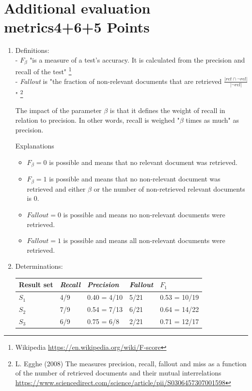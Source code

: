 \documentclass[10pt,a4paper]{article}
\begin{document}
\section{\hfill Additional evaluation metrics\hfill 4+6+5 Points}
\begin{enumerate}
    \item Definitions:\\
        - $F_\beta$ "is a measure of a test's accuracy. It is calculated from the precision and recall of the test" \footnote{Wikipedia \url{https://en.wikipedia.org/wiki/F-score}}\\
        - \textit{Fallout} is "the fraction of non-relevant documents that are retrieved $ \frac{|ret\cap \neg rel|}{|\neg rel|} $" \footnote{L. Egghe (2008) The measures precision, recall, fallout and miss as a function of the number of retrieved documents and their mutual interrelations \url{https://www.sciencedirect.com/science/article/pii/S0306457307001598}}
        
        The impact of the parameter $\beta$ is that it defines the weight of recall in relation to precision. In other words, recall is weighed "$\beta$ times as much" as precision.
        
        Explanations
        \begin{itemize}
            \item $F_\beta=0$ is possible and means that no relevant document was retrieved.
            \item $F_\beta=1$ is possible and means that no non-relevant document was retrieved and either $\beta$ or the number of non-retrieved relevant documents is $0$.
            \item $Fallout=0$ is possible and means no non-relevant documents were retrieved.
            \item $Fallout=1$ is possible and means all non-relevant documents were retrieved.
        \end{itemize}
    \item Determinations:
    
        \begin{tabular}{l|l|l|l|l}
            Result set&\textit{Recall}&\textit{Precision}&\textit{Fallout}&$F_1$\\
            \hline
            $S_1$ &4/9   &0.40 = 4/10   &5/21   &0.53 = 10/19\\
            $S_2$ &7/9   &0.54 = 7/13   &6/21   &0.64 = 14/22\\
            $S_3$ &6/9   &0.75 = 6/8   &2/21   &0.71 = 12/17\\
        \end{tabular}
        

\end{enumerate}
\end{document}
